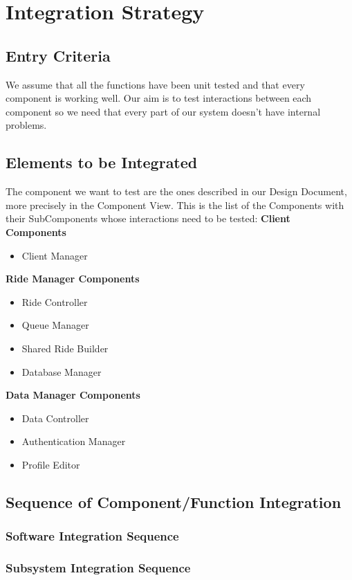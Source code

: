 \section{Integration Strategy}
\subsection{Entry Criteria}
We assume that all the functions have been unit tested and that every component is working well. Our aim is to test interactions between each component so we need that every part of our system doesn't have internal problems.
\subsection{Elements to be Integrated}
The component we want to test are the ones described in our Design Document, more precisely in the Component View.\newline
This is the list of the Components with their SubComponents whose interactions need to be tested: \newline
\newline
\textbf{Client Components}
\begin {itemize}
\item Client Manager
\end {itemize}
\textbf{Ride Manager Components}
\begin{itemize}
\item Ride Controller
\item Queue Manager
\item Shared Ride Builder
\item Database Manager
\end {itemize}
\textbf{Data Manager Components}
\begin {itemize}
\item Data Controller
\item Authentication Manager
\item Profile Editor
\end{itemize}
\subsection{Sequence of Component/Function Integration}
\subsubsection{Software Integration Sequence}
\subsubsection{Subsystem Integration Sequence}